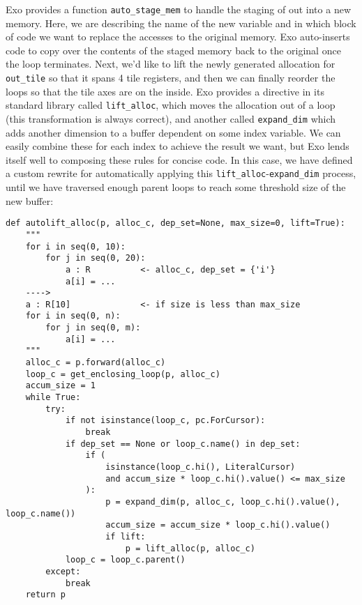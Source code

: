 \documentclass[acmsmall, nonacm=true]{acmart}
\begin{document}
Exo provides a function \verb|auto_stage_mem| to handle the staging of out into a new memory. Here, we are describing the name of the new variable and in which block of code we want to replace the accesses to the original memory. Exo auto-inserts code to copy over the contents of the staged memory back to the original once the loop terminates. 
Next, we'd like to lift the newly generated allocation for \verb|out_tile| so that it spans 4 tile registers, and then we can finally reorder the loops so that the tile axes are on the inside. Exo provides a directive in its standard library called \verb|lift_alloc|, which moves the allocation out of a loop (this transformation is always correct), and another called \verb|expand_dim| which adds another dimension to a buffer dependent on some index variable. We can easily combine these for each index to achieve the result we want, but Exo lends itself well to composing these rules for concise code. In this case, we have defined a custom rewrite for automatically applying this \verb|lift_alloc|-\verb|expand_dim| process, until we have traversed enough parent loops to reach some threshold size of the new buffer:
\begin{verbatim}
def autolift_alloc(p, alloc_c, dep_set=None, max_size=0, lift=True):
    """
    for i in seq(0, 10):
        for j in seq(0, 20):
            a : R          <- alloc_c, dep_set = {'i'}
            a[i] = ...
    ---->
    a : R[10]              <- if size is less than max_size
    for i in seq(0, n):
        for j in seq(0, m):
            a[i] = ...
    """
    alloc_c = p.forward(alloc_c)
    loop_c = get_enclosing_loop(p, alloc_c)
    accum_size = 1
    while True:
        try:
            if not isinstance(loop_c, pc.ForCursor):
                break
            if dep_set == None or loop_c.name() in dep_set:
                if (
                    isinstance(loop_c.hi(), LiteralCursor)
                    and accum_size * loop_c.hi().value() <= max_size
                ):
                    p = expand_dim(p, alloc_c, loop_c.hi().value(), loop_c.name())
                    accum_size = accum_size * loop_c.hi().value()
                    if lift:
                        p = lift_alloc(p, alloc_c)
            loop_c = loop_c.parent()
        except:
            break
    return p
\end{verbatim}
\end{document}
